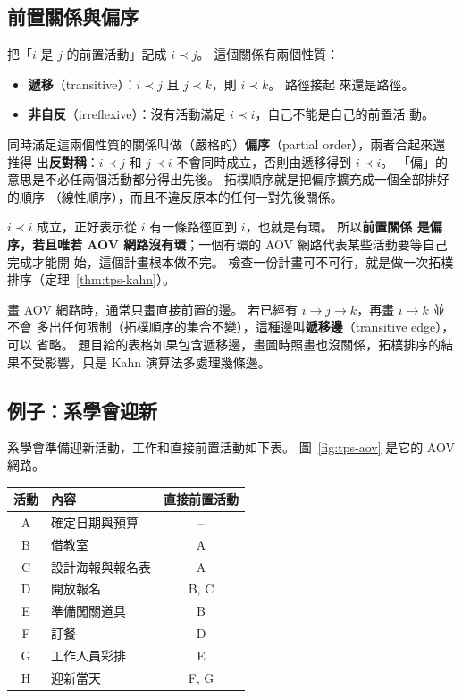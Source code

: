 \subsection{前置關係與偏序}

把「$i$ 是 $j$ 的前置活動」記成 $i \prec j$。 這個關係有兩個性質：
\begin{itemize}
\item \textbf{遞移}（transitive）：$i \prec j$ 且 $j \prec k$，則 $i \prec k$。 路徑接起
來還是路徑。
\item \textbf{非自反}（irreflexive）：沒有活動滿足 $i \prec i$，自己不能是自己的前置活
動。
\end{itemize}
同時滿足這兩個性質的關係叫做（嚴格的）\textbf{偏序}（partial order），兩者合起來還推得
出\textbf{反對稱}：$i \prec j$ 和 $j \prec i$ 不會同時成立，否則由遞移得到 $i \prec i$。
「偏」的意思是不必任兩個活動都分得出先後。 拓樸順序就是把偏序擴充成一個全部排好的順序
（線性順序），而且不違反原本的任何一對先後關係。

$i \prec i$ 成立，正好表示從 $i$ 有一條路徑回到 $i$，也就是有環。 所以\textbf{前置關係
是偏序，若且唯若 AOV 網路沒有環}；一個有環的 AOV 網路代表某些活動要等自己完成才能開
始，這個計畫根本做不完。 檢查一份計畫可不可行，就是做一次拓樸排序（定理~\ref{thm:tps-kahn}）。

畫 AOV 網路時，通常只畫直接前置的邊。 若已經有 $i \to j \to k$，再畫 $i \to k$ 並不會
多出任何限制（拓樸順序的集合不變），這種邊叫\textbf{遞移邊}（transitive edge），可以
省略。 題目給的表格如果包含遞移邊，畫圖時照畫也沒關係，拓樸排序的結果不受影響，只是
Kahn 演算法多處理幾條邊。

\subsection{例子：系學會迎新}

系學會準備迎新活動，工作和直接前置活動如下表。 圖~\ref{fig:tps-aov} 是它的 AOV 網路。

\begin{center}
\begin{tabular}{clc}
\toprule
活動 & 內容 & 直接前置活動 \\
\midrule
A & 確定日期與預算 & -- \\
B & 借教室 & A \\
C & 設計海報與報名表 & A \\
D & 開放報名 & B, C \\
E & 準備闖關道具 & B \\
F & 訂餐 & D \\
G & 工作人員彩排 & E \\
H & 迎新當天 & F, G \\
\bottomrule
\end{tabular}
\end{center}

